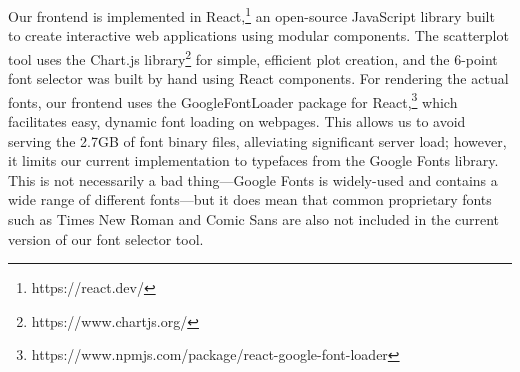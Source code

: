 Our frontend is implemented in React,\footnote{https://react.dev/} an open-source JavaScript library built to create interactive web applications using modular components. The scatterplot tool uses the Chart.js library\footnote{https://www.chartjs.org/} for simple, efficient plot creation, and the 6-point font selector was built by hand using React components. For rendering the actual fonts, our frontend uses the GoogleFontLoader package for React,\footnote{https://www.npmjs.com/package/react-google-font-loader} which facilitates easy, dynamic font loading on webpages. This allows us to avoid serving the 2.7GB of font binary files, alleviating significant server load; however, it limits our current implementation to typefaces from the Google Fonts library. This is not necessarily a bad thing—Google Fonts is widely-used and contains a wide range of different fonts—but it does mean that common proprietary fonts such as Times New Roman and Comic Sans are also not included in the current version of our font selector tool.